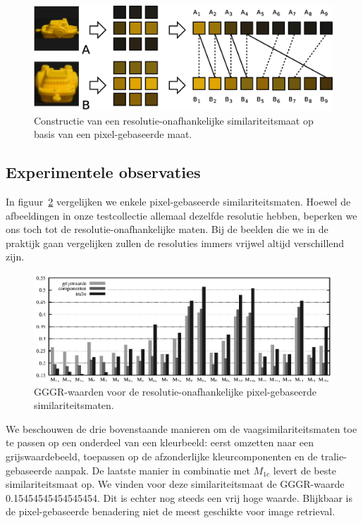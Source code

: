 \begin{figure}[tbp]
\begin{center}
\includegraphics[width=\textwidth]{images/multires.eps}
\caption{\label{fig:multires}Constructie van een resolutie-onafhankelijke similariteitsmaat op basis van een pixel-gebaseerde maat.}
\end{center}
\end{figure}

\subsection{Experimentele observaties}

In figuur~\ref{fig:pixelgeb_gggrs} vergelijken we enkele pixel-gebaseerde similariteitsmaten.
Hoewel de afbeeldingen in onze testcollectie allemaal dezelfde resolutie hebben, beperken we
ons toch tot de resolutie-onafhankelijke maten. Bij de beelden die we in de praktijk gaan 
vergelijken zullen de resoluties immers vrijwel altijd verschillend zijn.

\begin{figure}[tbp]
\begin{center}
\includegraphics[width=\textwidth]{plots/pixelgeb_gggrs_filled.eps}
\caption{\label{fig:pixelgeb_gggrs}GGGR-waarden voor de resolutie-onafhankelijke pixel-gebaseerde similariteitsmaten.}
\end{center}
\end{figure}

We beschouwen de drie bovenstaande manieren om de vaagsimilariteitsmaten toe te passen op een 
onderdeel van een kleurbeeld:
eerst omzetten naar een grijswaardebeeld, 
toepassen op de afzonderlijke kleurcomponenten en 
de tralie-gebaseerde aanpak.
De laatste manier in combinatie met $M_{1c}$ levert de beste similariteitsmaat op. We vinden
voor deze similariteitsmaat de GGGR-waarde 0.15454545454545454. Dit is echter nog steeds een
vrij hoge waarde. Blijkbaar is de pixel-gebaseerde benadering niet de meest geschikte
voor image retrieval. 


